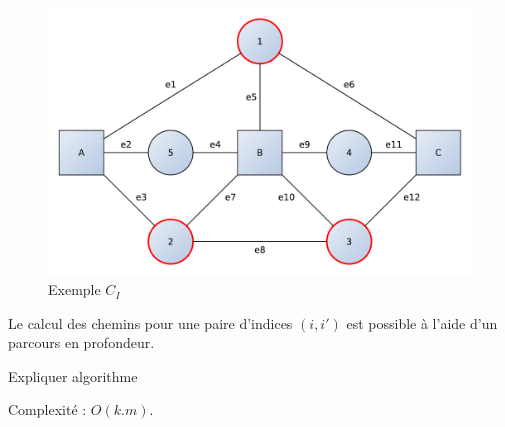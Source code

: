 \begin{figure}[H!]
	\centering
	\includegraphics[scale=0.60]{./img/exemple1}
	\caption{Exemple $C_{I}$}
	\label{fig:exemple1}
\end{figure}

Le calcul des chemins pour une paire d'indices $(i, i')$ est possible à l'aide
d'un parcours en profondeur.
\begin{todo}
	Expliquer algorithme
\end{todo}
\begin{todo}
	Complexité : $O(k.m)$.
\end{todo}

